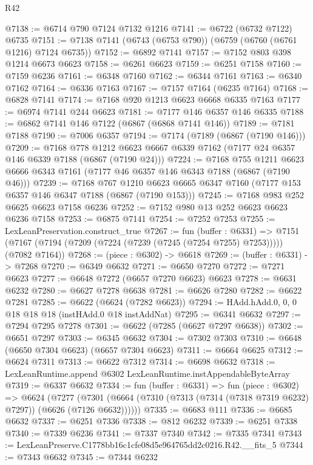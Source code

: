 \begin{lexlean}{R42}
\begin{coremodule}
{@7138 := @6714 @790 @7124 @7132 @1216
@7141 := @6722 (@6732 @7122) @6735
@7151 := @7138 @7141 (@6743 (@6753 @790)) (@6759 (@6760 (@6761 @1216) @7124 @6735))
@7152 := @6892 @7141
@7157 := @7152 @803 @398 @1214 @6673 @6623
@7158 := @6261 @6623
@7159 := @6251 @7158
@7160 := @7159 @6236
@7161 := @6348 @7160
@7162 := @6344 @7161
@7163 := @6340 @7162
@7164 := @6336 @7163
@7167 := @7157 @7164 (@6235 @7164)
@7168 := @6828 @7141
@7174 := @7168 @920 @1213 @6623 @6668 @6335 @7163
@7177 := @6974 @7141 @244 @6623
@7181 := @7177 @146 @6357 @146 @6335
@7188 := @6862 @7141 @146 @7122 (@6867 (@6868 @7141 @146))
@7189 := @7181 @7188
@7190 := @7006 @6357
@7194 := @7174 (@7189 (@6867 (@7190 @146)))
@7209 := @7168
    @778
    @1212
    @6623
    @6667
    @6339
    @7162
    (@7177 @24 @6357 @146 @6339 @7188 (@6867 (@7190 @24)))
@7224 := @7168
    @755
    @1211
    @6623
    @6666
    @6343
    @7161
    (@7177 @46 @6357 @146 @6343 @7188 (@6867 (@7190 @46)))
@7239 := @7168
    @767
    @1210
    @6623
    @6665
    @6347
    @7160
    (@7177 @153 @6357 @146 @6347 @7188 (@6867 (@7190 @153)))
@7245 := @7168 @983 @252 @6625 @6623 @7158 @6236
@7252 := @7152 @980 @13 @252 @6623 @6623 @6236 @7158
@7253 := @6875 @7141
@7254 := @7252 @7253
@7255 := LexLeanPreservation.construct_true
@7267 := fun (buffer : @6331) =>
  @7151 (@7167 (@7194 (@7209 (@7224 (@7239 (@7245 (@7254 @7255) @7253))))) (@7082 @7164))
@7268 := (piece : @6302) -> @6618
@7269 := (buffer : @6331) -> @7268
@7270 := @6349 @6632
@7271 := @6650 @7270
@7272 := @7271 @6623
@7277 := @6648 @7272 (@6657 @7270 @6623) @6623
@7278 := @6631 @6232
@7280 := @6627 @7278 @6638
@7281 := @6626 @7280
@7282 := @6622 @7281
@7285 := @6622 (@6624 (@7282 @6623))
@7294 := HAdd.hAdd.{0, 0, 0} @18 @18 @18 (instHAdd.{0} @18 instAddNat)
@7295 := @6341 @6632
@7297 := @7294 @7295 @7278
@7301 := @6622 (@7285 (@6627 @7297 @6638))
@7302 := @6651 @7297
@7303 := @6345 @6632
@7304 := @7302 @7303
@7310 := @6648 (@6650 @7304 @6623) (@6657 @7304 @6623)
@7311 := @6664 @6625
@7312 := @6624 @7311
@7313 := @6622 @7312
@7314 := @6698 @6632
@7318 := LexLeanRuntime.append @6302 LexLeanRuntime.instAppendableByteArray
@7319 := @6337 @6632
@7334 := fun (buffer : @6331) =>
  fun (piece : @6302) =>
  @6624
    (@7277 (@7301 (@6664 (@7310 (@7313 (@7314 (@7318 @7319 @6232) @7297)) (@6626 (@7126 @6632))))))
@7335 := @6683 @111
@7336 := @6685 @6632
@7337 := @6251 @7336
@7338 := @812 @6232
@7339 := @6251 @7338
@7340 := @7339 @6236
@7341 := @7337 @7340
@7342 := @7335 @7341
@7343 := LexLeanPreserve.C1778bb16c1cfe08d5e964765dd2c0216.R42.__fits_5
@7344 := @7343 @6632
@7345 := @7344 @6232
}
\end{coremodule}
\end{lexlean}
